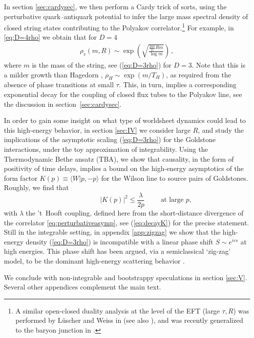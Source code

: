 \documentclass[
 reprint,
 amsmath,
 pre,
 amssymb,
 nofootinbib,
 aps,
 longbibliography,
]{revtex4-1}
\newcommand{\<}{{\langle}}
\renewcommand{\>}{{\rangle}}
\begin{document}
In section \ref{sec:cardysec}, we then perform a Cardy trick of sorts, using the perturbative quark–antiquark potential to infer the large mass spectral density of closed string states contributing to the Polyakov correlator.\footnote{A similar open-closed duality analysis at the level of the EFT (large $\tau, R$) was performed by Lüscher and Weiss in \cite{Luscher:2002qv,Luscher:2004ib} (see also \cite{Aharony:2010cx}), and was recently generalized to the baryon junction in \cite{Komargodski:2024swh}.} For example, in \eqref{eq:D=4rho} we obtain that for  $D=4$
\begin{align}
	\rho_v( m,R) \sim \exp\left(\sqrt{\frac{\frac{24\pi}{11}R m}{\log   m}}\right)\,,
\end{align}
where $ m$ is the mass of the string, see (\ref{eq:D=3rho}) for $D=3$. Note that this is a milder growth than Hagedorn \cite{Hagedorn:1965st}, $\rho_H\sim \exp( m/T_H)$, as required from the absence of phase transitions at small $\tau$. This, in turn, implies a corresponding exponential decay for the coupling of closed flux tubes to the Polyakov line, see the discussion in section~\ref{sec:cardysec}.

In order to gain some insight on what type of worldsheet dynamics could lead to this high-energy behavior, in section \ref{sec:IV} we consider large $R$, and study the implications of the asymptotic scaling (\ref{eq:D=3rho}) for the Goldstone interactions, under the toy approximation of integrability. Using the Thermodynamic Bethe ansatz (TBA), we show that causality, in the form of positivity of time delays, implies a bound on the high-energy asymptotics of the form factor $K(p)\equiv\langle W|p,-p\rangle$ for the Wilson line to source pairs of Goldstones. Roughly, we find that
\begin{equation}
  \phantom{ at large p}
  \qquad |K(p)|^2 \leq \frac{\lambda}{2p} \qquad
  \text{ at large $p$},
\end{equation}
 with $\lambda$ the 't~Hooft coupling, defined here from the short-distance divergence of the correlator \eqref{eq:perturbativeasymp}, see (\ref{eq:decayK}) for the precise statement.
 Still in the integrable setting, in appendix \ref{app:zigzag} we show that the high-energy density (\ref{eq:D=3rho}) is incompatible with a linear phase shift $S\sim e^{ics}$ at high energies.
 This phase shift has been argued, via a semiclassical `zig-zag' model, to be the dominant high-energy scattering behavior \cite{Dubovsky:2018dlk,Dubovsky_2018}.


We conclude with non-integrable and bootstrappy speculations in section \ref{sec:V}. Several other appendices complement the main text.
\end{document}
